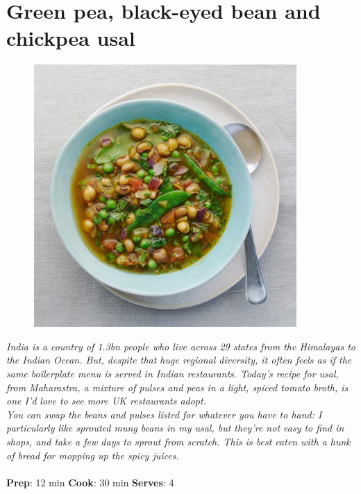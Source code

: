 \documentclass{book}
\begin{document}
\section{Green pea, black-eyed bean and chickpea usal}
\begin{figure}
\centering\includegraphics[width=10cm,height=10cm,keepaspectratio]{Recipe_Pictures/Green_pea,_black-eyed_bean_and_chickpea_usal.png}
\end{figure}
\emph{India is a country of 1.3bn people who live across 29 states from the Himalayas to the Indian Ocean. But, despite that huge regional diversity, it often feels as if the same boilerplate menu is served in Indian restaurants. Today’s recipe for usal, from Maharastra, a mixture of pulses and peas in a light, spiced tomato broth, is one I’d love to see more UK restaurants adopt.\\ 
You can swap the beans and pulses listed for whatever you have to hand: I particularly like sprouted mung beans in my usal, but they’re not easy to find in shops, and take a few days to sprout from scratch. This is best eaten with a hunk of bread for mopping up the spicy juices.}\\\\ 
\textbf{Prep}: 12 min
\textbf{Cook}: 30 min
\textbf{Serves}: 4
\end{document}
